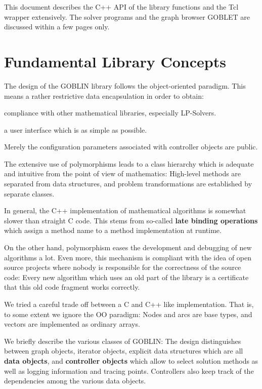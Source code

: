 \documentclass[a4paper,11pt,twoside]{book}
\begin{document}
\begin{multicols}{2}
This document describes the C++ API of the library functions and the Tcl
wrapper extensively. The solver programs and the graph browser GOBLET are
discussed within a few pages only.


\section{Fundamental Library Concepts}

The design of the GOBLIN library follows the object-oriented paradigm.
This means a rather restrictive data encapsulation in order to obtain:
\begin{myitemize}
\item compliance with other mathematical libraries, especially LP-Solvers.
\item a user interface which is as simple as possible.
\end{myitemize}
Merely the configuration parameters associated with controller objects are
public.

The extensive use of polymorphisms leads to a class hierarchy which is
adequate and intuitive from the point of view of mathematics: High-level
methods are separated from data structures, and problem transformations are
established by separate classes.

In general, the C++ implementation of mathematical algorithms is somewhat
slower than straight C code. This stems from so-called {\bf late binding
operations} which assign a method name to a method implementation at runtime.

On the other hand, polymorphism eases the development and debugging of new
algorithms a lot. Even more, this mechanism is compliant with the idea of open
source projects where nobody is responsible for the correctness of the source
code: Every new algorithm which uses an old part of the library is a
certificate that this old code fragment works correctly.

We tried a careful trade off between a C and C++ like implementation. That is,
to some extent we ignore the OO paradigm: Nodes and arcs are base types, and
vectors are implemented as ordinary arrays.

We briefly describe the various classes of GOBLIN: The design distinguishes
between graph objects, iterator objects, explicit data structures which are all
{\bf data objects}, and {\bf controller objects} which allow to select
solution methods as well as logging information and tracing points. Controllers
also keep track of the dependencies among the various data objects.


\end{multicols}
\end{document}
